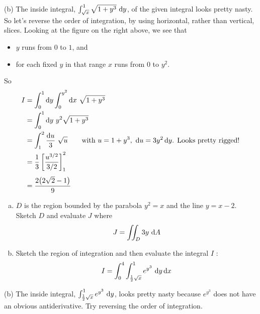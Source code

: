 \begin{solution}
(b) The inside integral, $\int_{\sqrt{x}}^1 \sqrt{1+y^3}\ \mathrm{d}y$,
of the given integral looks pretty nasty. So let's reverse the order of 
integration, by using horizontal, rather than vertical, slices.
Looking at the figure on the right above, we see that
\begin{itemize}
\item
$y$ runs from $0$ to $1$, and
\item
for each fixed $y$ in that range
$x$ runs from $0$ to $y^2$.
\end{itemize}
So
\begin{align*}
I &= \int_0^1\mathrm{d}y \int_0^{y^2}\mathrm{d}x\ \sqrt{1+y^3} \\
&=\int_0^1\mathrm{d}y \ y^2\sqrt{1+y^3} \\
&=\int_1^2\frac{\mathrm{d}u}{3}\ \sqrt{u}
\qquad\text{with $u=1+y^3,\ \mathrm{d}u=3y^2\,\mathrm{d}y$. Looks pretty rigged!} \\
&=\frac{1}{3} \left[\frac{u^{3/2}}{3/2}\right]_1^2 \\[0.05in]
&=\frac{2\big(2\sqrt{2}-1\big)}{9}
\end{align*}
\end{solution}

\begin{question}[M200 2010D] %
\begin{enumerate}[(a)]
\item
$D$ is the region bounded by the parabola $y^2 = x$ and the line $y = x - 2$.
Sketch $D$ and evaluate $J$ where
\begin{equation*}
J = \dblInt_D 3y\ \dee{A}
\end{equation*}
\item
Sketch the region of integration and then evaluate the integral $I$ :
\begin{equation*}
I = \int_0^4  \int_{\frac{1}{2}\sqrt{x}}^1  e^{y^3}\ \dee{y}\,\dee{x}
\end{equation*}
\end{enumerate}
\end{question}

\begin{hint}
(b) The inside integral, $\int_{\frac{1}{2}\sqrt{x}}^1  e^{y^3}\ \dee{y}$, 
looks pretty nasty because $e^{y^3}$ does not have an obvious antiderivative. 
Try reversing the order of integration. 
\end{hint}

